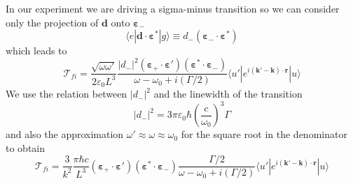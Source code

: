 \documentclass[11pt,letter]{article}
\newcommand{\bv}[1]{\ensuremath{\bm{#1}}}
\begin{document}
In our experiment we are driving a sigma-minus transition so we can consider
only the projection of $\bv{d}$ onto $\bv{\varepsilon}_{-}$ 
\begin{equation}
     \langle e | \bv{d} \cdot \bv{\varepsilon}^{*} | g \rangle  \equiv
     d_{-} (\bv{\varepsilon}_{-}  \cdot \bv{\varepsilon}^{*} )
\end{equation} 
which leads to 
\begin{equation}
    \mathcal{T}_{fi}  = 
    \frac{\sqrt{\omega \omega'}}{2\varepsilon_{0} L^{3}}
    \frac{ |d_{-}|^{2}  (\bv{\varepsilon}_{+}\cdot \bv{\varepsilon}' )
                       (\bv{\varepsilon}^{*}\cdot \bv{\varepsilon}_{-} )}
        { \omega - \omega_{0} + i (\Gamma/2 ) }
      \langle u' | e^{i(\bv{k}'-\bv{k}) \cdot\bv{r}} | u  \rangle
\end{equation}
We use the relation between $|d_{-}|^{2}$ and the linewidth of the transition
\begin{equation} 
    |d_{-}|^{2} =  3\pi \varepsilon_{0} \hbar
  \left( \frac{c}{\omega_{0}} \right)^{3}  \Gamma
\end{equation}
and also the approximation $\omega' \approx \omega \approx \omega_{0}$ for the
square root in the denominator to obtain
\begin{equation}
    \mathcal{T}_{fi} =
    \frac{ 3 } {k^{2}} 
    \frac{ \pi \hbar c } {  L^{3} } 
        (\bv{\varepsilon}_{+}\cdot \bv{\varepsilon}' )
                       (\bv{\varepsilon}^{*}\cdot \bv{\varepsilon}_{-} )
    \frac{ \Gamma/2  }
        { \omega - \omega_{0} + i (\Gamma/2 ) }
      \langle u' | e^{i(\bv{k}'-\bv{k}) \cdot\bv{r}} | u  \rangle
\end{equation}
\end{document}

